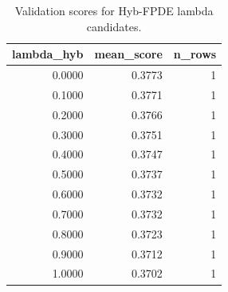 \begin{table}[t]
\caption{Validation scores for Hyb-FPDE lambda candidates.}
\label{tab:lambda_distribution_computed}
\centering
\begin{tabular}{rrr}
\toprule
lambda\_hyb & mean\_score & n\_rows \\
\midrule
0.0000 & 0.3773 & 1 \\
0.1000 & 0.3771 & 1 \\
0.2000 & 0.3766 & 1 \\
0.3000 & 0.3751 & 1 \\
0.4000 & 0.3747 & 1 \\
0.5000 & 0.3737 & 1 \\
0.6000 & 0.3732 & 1 \\
0.7000 & 0.3732 & 1 \\
0.8000 & 0.3723 & 1 \\
0.9000 & 0.3712 & 1 \\
1.0000 & 0.3702 & 1 \\
\bottomrule
\end{tabular}

\end{table}
